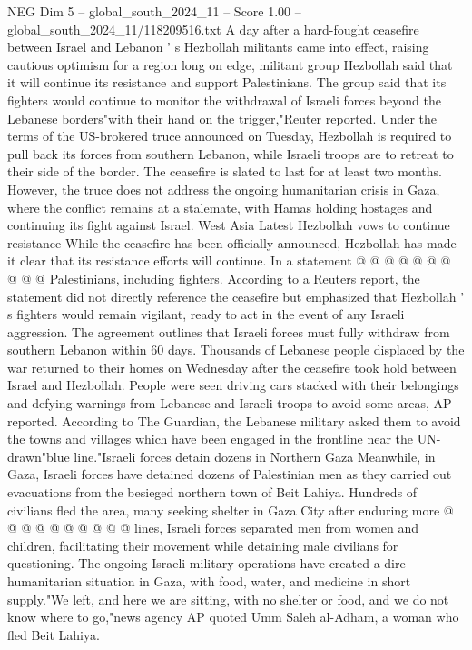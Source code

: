 \begin{textsample}{NEG Dim 5 – global\_south\_2024\_11 – Score 1.00 – global\_south\_2024\_11/118209516.txt}  \label{ex:f5_neg_436}
A day after a hard-fought ceasefire between Israel and Lebanon ' s Hezbollah militants came into effect, raising cautious optimism for a region long on edge, militant group Hezbollah said that it will continue its resistance and support Palestinians.
The group said that its fighters would continue to monitor the withdrawal of Israeli forces beyond the Lebanese borders"with their hand on the trigger,"Reuter reported.
Under the terms of the US-brokered truce announced on Tuesday, Hezbollah is required to pull back its forces from southern Lebanon, while Israeli troops are to retreat to their side of the border.
The ceasefire is slated to last for at least two months.
However, the truce does not address the ongoing humanitarian crisis in Gaza, where the conflict remains at a stalemate, with Hamas holding hostages and continuing its fight against Israel.
West Asia Latest Hezbollah vows to continue resistance While the ceasefire has been officially announced, Hezbollah has made it clear that its resistance efforts will continue.
In a statement @ @ @ @ @ @ @ @ @ @ Palestinians, including fighters.
According to a Reuters report, the statement did not directly reference the ceasefire but emphasized that Hezbollah ' s fighters would remain vigilant, ready to act in the event of any Israeli aggression.
The agreement outlines that Israeli forces must fully withdraw from southern Lebanon within 60 days.
Thousands of Lebanese people displaced by the war returned to their homes on Wednesday after the ceasefire took hold between Israel and Hezbollah.
People were seen driving cars stacked with their belongings and defying warnings from Lebanese and Israeli troops to avoid some areas, AP reported.
According to The Guardian, the Lebanese military asked them to avoid the towns and villages which have been engaged in the frontline near the UN-drawn"blue line."Israeli forces detain dozens in Northern Gaza Meanwhile, in Gaza, Israeli forces have detained dozens of Palestinian men as they carried out evacuations from the besieged northern town of Beit Lahiya.
Hundreds of civilians fled the area, many seeking shelter in Gaza City after enduring more @ @ @ @ @ @ @ @ @ @ lines, Israeli forces separated men from women and children, facilitating their movement while detaining male civilians for questioning.
The ongoing Israeli military operations have created a dire humanitarian situation in Gaza, with food, water, and medicine in short supply."We left, and here we are sitting, with no shelter or food, and we do not know where to go,"news agency AP quoted Umm Saleh al-Adham, a woman who fled Beit Lahiya.

\end{textsample}
